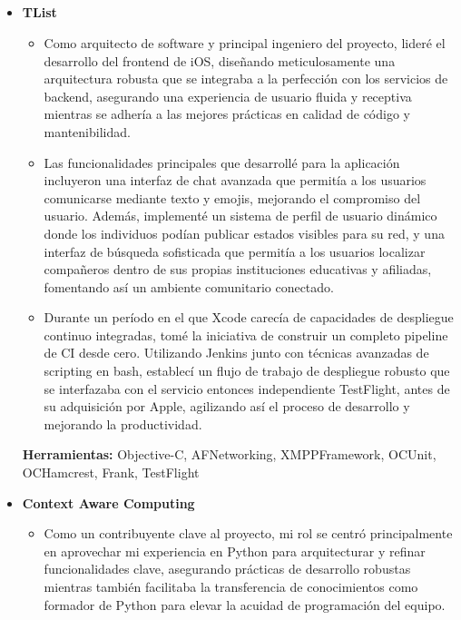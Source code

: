\documentclass[11pt,a4paper,english]{moderncv}
\begin{document}
\subsection{}

{
\begin{itemize}
    \item \textbf{TList}
        \begin{itemize}
            \item Como arquitecto de software y principal ingeniero del proyecto, lideré el desarrollo del frontend de iOS, diseñando meticulosamente una arquitectura robusta que se integraba a la perfección con los servicios de backend, asegurando una experiencia de usuario fluida y receptiva mientras se adhería a las mejores prácticas en calidad de código y mantenibilidad.
            \item Las funcionalidades principales que desarrollé para la aplicación incluyeron una interfaz de chat avanzada que permitía a los usuarios comunicarse mediante texto y emojis, mejorando el compromiso del usuario. Además, implementé un sistema de perfil de usuario dinámico donde los individuos podían publicar estados visibles para su red, y una interfaz de búsqueda sofisticada que permitía a los usuarios localizar compañeros dentro de sus propias instituciones educativas y afiliadas, fomentando así un ambiente comunitario conectado.
            \item Durante un período en el que Xcode carecía de capacidades de despliegue continuo integradas, tomé la iniciativa de construir un completo pipeline de CI desde cero. Utilizando Jenkins junto con técnicas avanzadas de scripting en bash, establecí un flujo de trabajo de despliegue robusto que se interfazaba con el servicio entonces independiente TestFlight, antes de su adquisición por Apple, agilizando así el proceso de desarrollo y mejorando la productividad.
        \end{itemize}
        \textbf{Herramientas:} Objective-C, AFNetworking, XMPPFramework, OCUnit, OCHamcrest, Frank, TestFlight
    \item \textbf{Context Aware Computing}
        \begin{itemize}
            \item Como un contribuyente clave al proyecto, mi rol se centró principalmente en aprovechar mi experiencia en Python para arquitecturar y refinar funcionalidades clave, asegurando prácticas de desarrollo robustas mientras también facilitaba la transferencia de conocimientos como formador de Python para elevar la acuidad de programación del equipo.

\end{itemize}
\end{itemize}}
\end{document}
